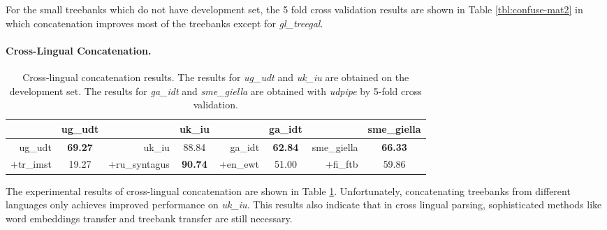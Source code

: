 \documentclass[11pt,a4paper]{article}
\begin{document}
For the small treebanks which do not have development set,
the 5 fold cross validation results are shown in Table \ref{tbl:confuse-mat2}
in which concatenation improves most of the treebanks except for \textit{gl\_treegal}.

\paragraph{Cross-Lingual Concatenation.}
\begin{table}[t]
	\centering
	\small
	\begin{tabular}{rc || rc || rc || rc}
		& ug\_udt  &  & uk\_iu & & ga\_idt & & sme\_giella \\
		\hline
		ug\_udt & \textbf{69.27} & uk\_iu & 88.84 & ga\_idt & \textbf{62.84} & sme\_giella & \textbf{66.33}\\
		+tr\_imst & 19.27 & +ru\_syntagus & \textbf{90.74} & +en\_ewt &51.00 & +fi\_ftb & 59.86\\
	\end{tabular}
	\caption{Cross-lingual concatenation results. 
		The results for \textit{ug\_udt} and \textit{uk\_iu} are obtained on the development set.
		The results for \textit{ga\_idt} and \textit{sme\_giella} are obtained with \textit{udpipe} by 5-fold cross validation.}\label{tbl:cross-ling-concat}
\end{table}

The experimental results of cross-lingual concatenation are shown in Table \ref{tbl:cross-ling-concat}.
Unfortunately, concatenating treebanks from different languages only
achieves improved performance on \textit{uk\_iu}.
This results also indicate that in cross lingual parsing,
sophisticated methods like word embeddings transfer \cite{guo-EtAl:2015:ACL-IJCNLP2} and treebank transfer \cite{C16-1002}
are still necessary.
\end{document}
